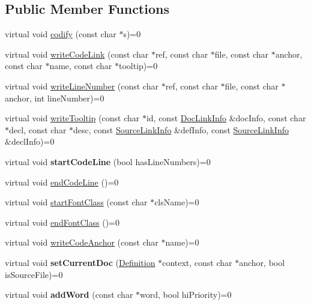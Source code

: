 \subsection*{Public Member Functions}
\begin{DoxyCompactItemize}
\item 
virtual void \mbox{\hyperlink{class_code_output_interface_aa29a5eedda08596ace50ed5b59c8ae7f}{codify}} (const char $\ast$s)=0
\item 
virtual void \mbox{\hyperlink{class_code_output_interface_a102e2b7f40916c75b79871307f5bb674}{write\+Code\+Link}} (const char $\ast$ref, const char $\ast$file, const char $\ast$anchor, const char $\ast$name, const char $\ast$tooltip)=0
\item 
virtual void \mbox{\hyperlink{class_code_output_interface_a8115646785b65e292480c2e4e969b389}{write\+Line\+Number}} (const char $\ast$ref, const char $\ast$file, const char $\ast$anchor, int line\+Number)=0
\item 
virtual void \mbox{\hyperlink{class_code_output_interface_a4326ca642f6ec228466ae310622f73ad}{write\+Tooltip}} (const char $\ast$id, const \mbox{\hyperlink{struct_doc_link_info}{Doc\+Link\+Info}} \&doc\+Info, const char $\ast$decl, const char $\ast$desc, const \mbox{\hyperlink{struct_source_link_info}{Source\+Link\+Info}} \&def\+Info, const \mbox{\hyperlink{struct_source_link_info}{Source\+Link\+Info}} \&decl\+Info)=0
\item 
\mbox{\label{class_code_output_interface_a080d71d457de084ce2b3245bca5a0d68}} 
virtual void {\bfseries start\+Code\+Line} (bool has\+Line\+Numbers)=0
\item 
virtual void \mbox{\hyperlink{class_code_output_interface_afac5763eafc78f93b82691fb9a6dcff7}{end\+Code\+Line}} ()=0
\item 
virtual void \mbox{\hyperlink{class_code_output_interface_ac90f75968cdcf127e0b02938bdb49d87}{start\+Font\+Class}} (const char $\ast$cls\+Name)=0
\item 
virtual void \mbox{\hyperlink{class_code_output_interface_a2b8ac05a391dae36793aa3aa8714a0f6}{end\+Font\+Class}} ()=0
\item 
virtual void \mbox{\hyperlink{class_code_output_interface_a1f6394c4ef7c4143de90bcaf3a65c0b4}{write\+Code\+Anchor}} (const char $\ast$name)=0
\item 
\mbox{\label{class_code_output_interface_a67a190860748597bd65b4cfc313797d3}} 
virtual void {\bfseries set\+Current\+Doc} (\mbox{\hyperlink{class_definition}{Definition}} $\ast$context, const char $\ast$anchor, bool is\+Source\+File)=0
\item 
\mbox{\label{class_code_output_interface_a2734a8371d6e710620ad238ed8de118e}} 
virtual void {\bfseries add\+Word} (const char $\ast$word, bool hi\+Priority)=0
\end{DoxyCompactItemize}


